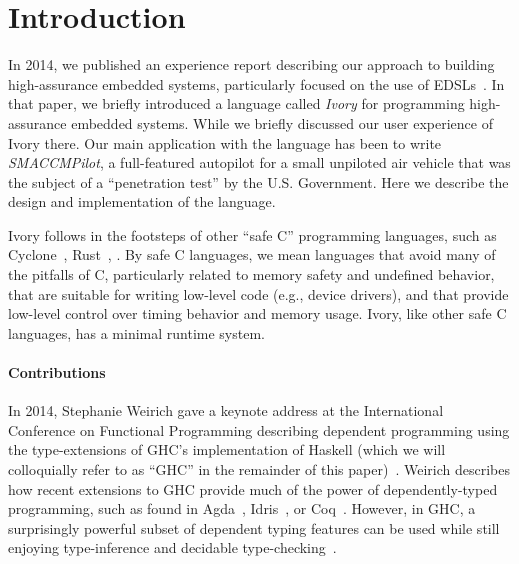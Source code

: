 \section{Introduction}
\label{sec:introduction}


In 2014, we published an experience report describing our approach to building
high-assurance embedded systems, particularly focused on the use of
EDSLs~\cite{smaccm}. In that paper, we briefly introduced a language called
\emph{Ivory} for programming high-assurance embedded systems. While we briefly
discussed our user experience of Ivory there. Our main application with the
language has been to write \emph{SMACCMPilot}, a full-featured autopilot for a
small unpiloted air vehicle that was the subject of a ``penetration test'' by
the U.S. Government. Here we describe the design and implementation of the
language.

Ivory follows in the footsteps of other ``safe C'' programming languages, such
as Cyclone~\cite{}, Rust~\cite{}, . By safe C languages, we mean
languages that avoid many of the pitfalls of C, particularly related to memory
safety and undefined behavior, that are suitable for writing low-level code
(e.g., device drivers), and that provide low-level control over timing behavior
and memory usage. Ivory, like other safe C languages, has a minimal runtime
system.

\paragraph{Contributions}
In 2014, Stephanie Weirich gave a keynote address at the International
Conference on Functional Programming describing dependent programming using the
type-extensions of GHC's implementation of Haskell (which we will colloquially
refer to as ``GHC'' in the remainder of this
paper)~\cite{weirich-keynote}. Weirich describes how recent extensions to GHC
provide much of the power of dependently-typed programming, such as found in
Agda~\cite{}, Idris~\cite{}, or Coq~\cite{}. However, in GHC, a surprisingly
powerful subset of dependent typing features can be used while still enjoying
type-inference and decidable type-checking~\cite{dephaskell}.

